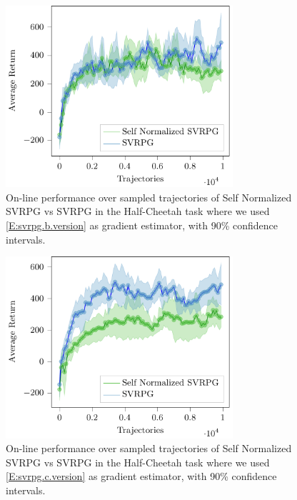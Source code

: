 \begin{figure}[h]
	\begin{minipage}[h]{1\textwidth}
		\centering
		\includegraphics[width=0.75\textwidth]{Images/Experiments/half_cheetah_SVRPG_vs_SN_SVRPG_B.pdf}
		\vspace{-0.1in}
		\caption{On-line performance over sampled trajectories of Self Normalized \acs{SVRPG} vs \acs{SVRPG} in the Half-Cheetah task where we used \ref{E:svrpg.b.version} as gradient estimator, with 90\% confidence intervals.}
		\label{fig:hcseven}
	\end{minipage}
	\vspace{-0.15in}
\end{figure}
\begin{figure}[h]
	\begin{minipage}[h]{1\textwidth}
		\centering
		\includegraphics[width=0.75\textwidth]{Images/Experiments/half_cheetah_SVRPG_vs_SN_SVRPG_C.pdf}
		\vspace{-0.1in}
		\caption{On-line performance over sampled trajectories of Self Normalized \acs{SVRPG} vs \acs{SVRPG} in the Half-Cheetah task where we used \ref{E:svrpg.c.version} as gradient estimator, with 90\% confidence intervals.}
		\label{fig:hcheight}
	\end{minipage}
	\vspace{-0.15in}
\end{figure}

